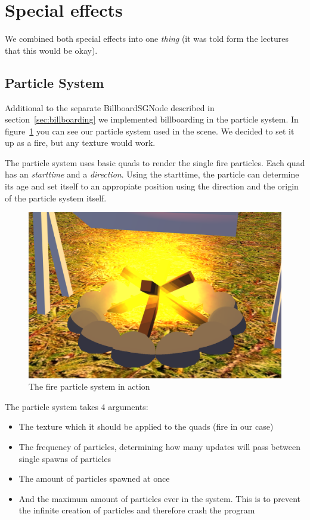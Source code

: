 \section{Special effects} \label{sec:specialEffects}
We combined both special effects into one \emph{thing} (it was told form the lectures that this would be okay).


\subsection{Particle System} \label{sec:particleSystem}
Additional to the separate BillboardSGNode described in section~\ref{sec:billboarding} we implemented billboarding in the particle system.
In figure~\ref{fig:particle} you can see our particle system used in the scene.
We decided to set it up as a fire, but any texture would work.


The particle system uses basic quads to render the single fire particles. Each quad has an \emph{starttime} and a \emph{direction}.
Using the starttime, the particle can determine its age and set itself to an appropiate position using
the direction and the origin of the particle system itself.


\begin{figure}[h]
	\centering
	\includegraphics[width=0.5\columnwidth]{figures/particle.png}
	\caption{The fire particle system in action}
	\label{fig:particle}
\end{figure}

The particle system takes 4 arguments:
\begin{itemize}
	\item The texture which it should be applied to the quads (fire in our case)
	\item The frequency of particles, determining how many updates will pass between single spawns of particles
	\item The amount of particles spawned at once
	\item And the maximum amount of particles ever in the system. This is to prevent the infinite creation of particles and therefore crash the program
\end{itemize}

